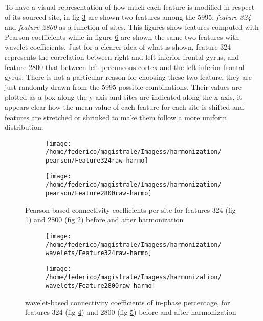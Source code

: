 \documentclass[11pt]{report}
\begin{document}
To have a visual representation of how much each feature is modified in respect of its sourced site, in fig \ref{fig:features_raw-harmo} are shown two features among the 5995: \emph{feature 324} and \emph{feature 2800} as a function of sites. This figures show features computed with Pearson coefficients while in figure \ref{fig:wavelet_features_raw-harmo} are shown the same two features with wavelet coefficients.
Just for a clearer idea of what is shown, feature 324 represents the correlation between right and left inferior frontal gyrus, and feature 2800 that between left precuneous cortex and the left inferior frontal gyrus. There is not a particular reason for choosing these two feature, they are just randomly drawn from the 5995 possible combinations.
Their values are plotted as a box along the y axis and sites are indicated along the x-axis, it appears clear how the mean value of each feature for each site is shifted and features are stretched or shrinked to make them follow a more uniform distribution.

\begin{figure}
\centering
\begin{subfigure}[b]{1.\textwidth}
   \texttt{[image: /home/federico/magistrale/Imagess/harmonization/pearson/Feature324raw-harmo]}
   \caption{}
   \label{fig:feature324}
\end{subfigure}
\begin{subfigure}[b]{1.\textwidth}
   \texttt{[image: /home/federico/magistrale/Imagess/harmonization/pearson/Feature2800raw-harmo]}
   \caption{}
   \label{fig:feature2800}
\end{subfigure}
\caption{Pearson-based connectivity coefficients per site for features 324 (fig \ref{fig:feature324}) and 2800 (fig \ref{fig:feature2800}) before and after harmonization}
\label{fig:features_raw-harmo}
\end{figure}



 \begin{figure}
 \centering
 \begin{subfigure}[b]{1.\textwidth}
    \texttt{[image: /home/federico/magistrale/Imagess/harmonization/wavelets/Feature324raw-harmo]}
    \caption{}
    \label{fig:wavelet_feature324}
 \end{subfigure}
 \begin{subfigure}[b]{1.\textwidth}
    \texttt{[image: /home/federico/magistrale/Imagess/harmonization/wavelets/Feature2800raw-harmo]}
    \caption{}
    \label{fig:wavelet_feature2800}
 \end{subfigure}
 \caption{wavelet-based connectivity coefficients of in-phase percentage, for features 324 (fig \ref{fig:wavelet_feature324}) and 2800 (fig \ref{fig:wavelet_feature2800}) before and after harmonization}
 \label{fig:wavelet_features_raw-harmo}
 \end{figure}
\end{document}
